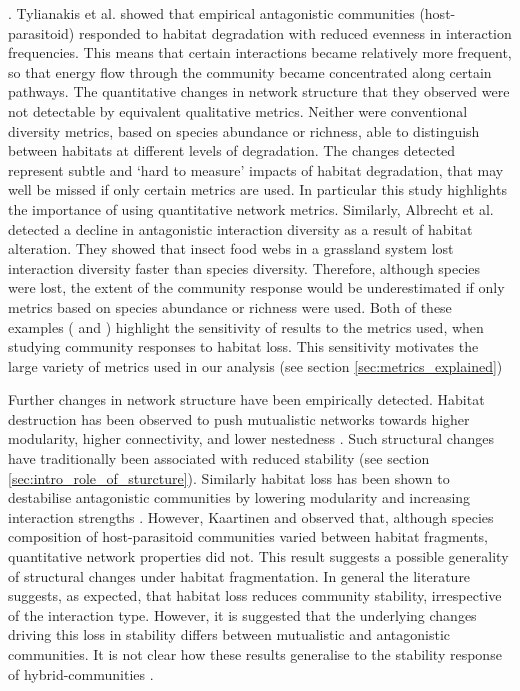 . Tylianakis et al. \cite{tylianakis2007habitat} showed that empirical antagonistic communities (host-parasitoid) responded to habitat degradation with reduced evenness in interaction frequencies. This means that certain interactions became relatively more frequent, so that energy flow through the community became concentrated along certain pathways. The quantitative changes in network structure that they observed were not detectable by equivalent qualitative metrics. Neither were conventional diversity metrics, based on species abundance or richness, able to distinguish between habitats at different levels of degradation. The changes detected represent subtle and `hard to measure' impacts of habitat degradation, that may well be missed if only certain metrics are used. In particular this study highlights the importance of using quantitative network metrics. Similarly, Albrecht et al. \cite{albrecht2007interaction} detected a decline in antagonistic interaction diversity as a result of habitat alteration. They showed that insect food webs in a grassland system lost interaction diversity faster than species diversity. Therefore, although species were lost, the extent of the community response would be underestimated if only metrics based on species abundance or richness were used. Both of these examples (\cite{tylianakis2007habitat} and \cite{albrecht2007interaction}) highlight the sensitivity of results to the metrics used, when studying community responses to habitat loss. This sensitivity motivates the large variety of metrics used in our analysis (see section \ref{sec:metrics_explained})

Further changes in network structure have been empirically detected. Habitat destruction has been observed to push mutualistic networks towards higher modularity, higher connectivity, and lower nestedness \cite{spiesman2013habitat}. Such structural changes have traditionally been associated with reduced stability (see section \ref{sec:intro_role_of_sturcture}). Similarly habitat loss has been shown to destabilise antagonistic communities by lowering modularity and increasing interaction strengths \cite{hagen2012biodiversity}. However, Kaartinen and  \cite{kaartinen2011shrinking} observed that, although species composition of host-parasitoid communities varied between habitat fragments, quantitative network properties did not. This result suggests a possible generality of structural changes under habitat fragmentation. In general the literature suggests, as expected, that habitat loss reduces community stability, irrespective of the interaction type. However, it is suggested that the underlying changes driving this loss in stability differs between mutualistic and antagonistic communities. It is not clear how these results generalise to the stability response of hybrid-communities . 

